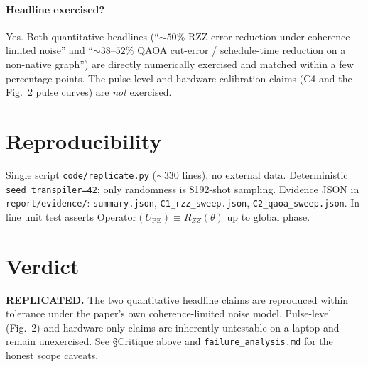 \documentclass[11pt]{article}
\begin{document}
\paragraph{Headline exercised?} Yes. Both quantitative headlines
(``$\sim 50\%$ RZZ error reduction under coherence-limited noise''
and ``$\sim 38\text{--}52\%$ QAOA cut-error / schedule-time
reduction on a non-native graph'') are directly numerically exercised
and matched within a few percentage points. The pulse-level and
hardware-calibration claims (C4 and the Fig.\ 2 pulse curves) are
\emph{not} exercised.

\section{Reproducibility}
Single script \texttt{code/replicate.py} ($\sim 330$ lines), no
external data. Deterministic \texttt{seed\_transpiler=42}; only
randomness is 8192-shot sampling. Evidence JSON in
\texttt{report/evidence/}: \texttt{summary.json},
\texttt{C1\_rzz\_sweep.json}, \texttt{C2\_qaoa\_sweep.json}. In-line
unit test asserts $\mathrm{Operator}(U_{\mathrm{PE}})\equiv
R_{ZZ}(\theta)$ up to global phase.

\section{Verdict}
\textbf{REPLICATED.} The two quantitative headline claims are
reproduced within tolerance under the paper's own coherence-limited
noise model. Pulse-level (Fig.\ 2) and hardware-only claims are
inherently untestable on a laptop and remain unexercised. See
\S Critique above and \texttt{failure\_analysis.md} for the honest
scope caveats.


\end{document}
